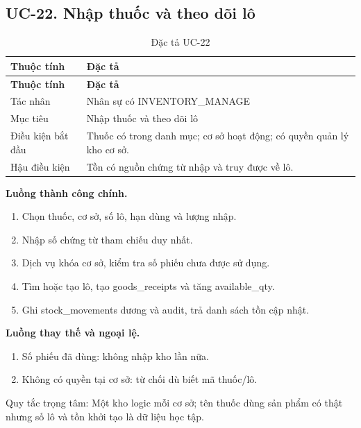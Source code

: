 \clearpage

\subsection{UC-22.\allowbreak{} Nhập thuốc và theo dõi lô}
\label{uc:22}

{\small\setlength{\tabcolsep}{3pt}\renewcommand{\arraystretch}{1.12}
\begin{longtable}{@{}L{\textwidth-1.32pt\relax} L{\textwidth-4.68pt\relax}@{}}
\caption{Đặc tả UC-22}\\
\toprule
\textbf{Thuộc tính} & \textbf{Đặc tả}\\\midrule
\endfirsthead
\toprule
\textbf{Thuộc tính} & \textbf{Đặc tả}\\\midrule
\endhead
\bottomrule\endlastfoot
Tác nhân & Nhân sự có INVENTORY\_\allowbreak{}MANAGE\\[3pt]
Mục tiêu & Nhập thuốc và theo dõi lô\\[3pt]
Điều kiện bắt đầu & Thuốc có trong danh mục; cơ sở hoạt động; có quyền quản lý kho cơ sở.\allowbreak{}\\[3pt]
Hậu điều kiện & Tồn có nguồn chứng từ nhập và truy được về lô.\allowbreak{}\\[3pt]
\end{longtable}}
\noindent\textbf{Luồng thành công chính.}
\begin{enumerate}
\item Chọn thuốc, cơ sở, số lô, hạn dùng và lượng nhập.\allowbreak{}
\item Nhập số chứng từ tham chiếu duy nhất.\allowbreak{}
\item Dịch vụ khóa cơ sở, kiểm tra số phiếu chưa được sử dụng.\allowbreak{}
\item Tìm hoặc tạo lô, tạo goods\_\allowbreak{}receipts và tăng available\_\allowbreak{}qty.\allowbreak{}
\item Ghi stock\_\allowbreak{}movements dương và audit, trả danh sách tồn cập nhật.\allowbreak{}
\end{enumerate}
\noindent\textbf{Luồng thay thế và ngoại lệ.}
\begin{enumerate}
\item Số phiếu đã dùng:\allowbreak{} không nhập kho lần nữa.\allowbreak{}
\item Không có quyền tại cơ sở:\allowbreak{} từ chối dù biết mã thuốc/\allowbreak{}lô.\allowbreak{}
\end{enumerate}
Quy tắc trọng tâm:\allowbreak{} Một kho logic mỗi cơ sở; tên thuốc dùng sản phẩm có thật nhưng số lô và tồn khởi tạo là dữ liệu học tập.\allowbreak{}

